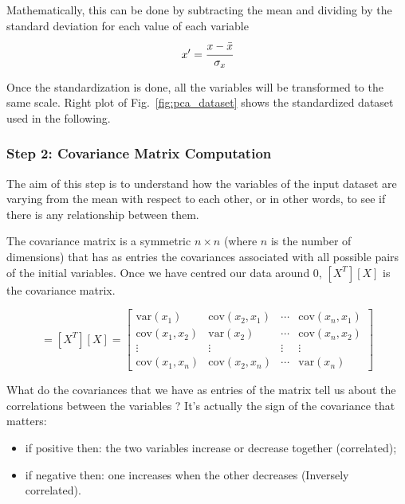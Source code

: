 Mathematically, this can be done by subtracting the mean and dividing by the standard deviation for each value of each variable
\begin{equation*}
x' = \cfrac{x-\bar{x}}{\sigma_x}
\end{equation*}

Once the standardization is done, all the variables will be transformed to the same scale. Right plot of Fig.~\ref{fig:pca_dataset} shows the standardized dataset used in the following.

\subsubsection*{Step 2: Covariance Matrix Computation}

The aim of this step is to understand how the variables of the input dataset are varying from the mean with respect to each other, or in other words, to see if there is any relationship between them. 

The covariance matrix is a symmetric $n\times n$ (where $n$ is the number of dimensions) that has as entries the covariances associated with all possible pairs of the initial variables. %
Once we have centred our data around 0, $[X^T][X]$ is the covariance matrix.

\begin{equation}
	[\Sigma]=[X^T][X] =
	\begin{bmatrix}
		\textrm{var}(x_1) & \textrm{cov}(x_2, x_1) & \cdots & \textrm{cov}(x_n, x_1) \\
		\textrm{cov}(x_1, x_2) & \textrm{var}(x_2) & \cdots & \textrm{cov}(x_n, x_2) \\
		\vdots & \vdots & \vdots & \vdots \\
		\textrm{cov}(x_1, x_n) & \textrm{cov}(x_2, x_n) & \cdots & \textrm{var}(x_n)
	\end{bmatrix}
\end{equation}

What do the covariances that we have as entries of the matrix tell us about the correlations between the variables ?
It’s actually the sign of the covariance that matters:
\begin{itemize}
	\item if positive then: the two variables increase or decrease together (correlated);
	\item if negative then: one increases when the other decreases (Inversely correlated).
\end{itemize}

